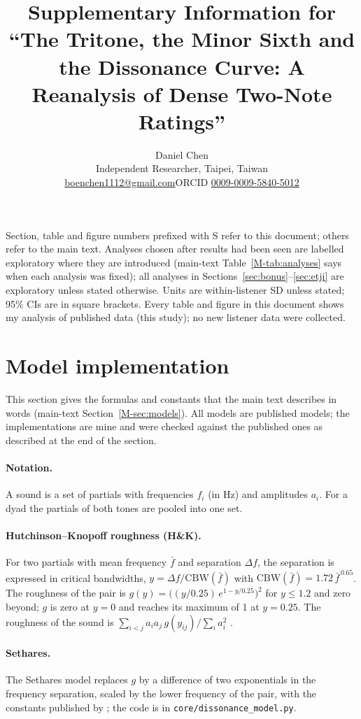 \documentclass[11pt,a4paper]{article}
\title{Supplementary Information for ``The Tritone, the Minor Sixth and the Dissonance Curve: A Reanalysis of Dense Two-Note Ratings''}
\author{Daniel Chen\\[2pt]\normalsize Independent Researcher, Taipei, Taiwan\\[2pt]
  \small \href{mailto:boenchen1112@gmail.com}{boenchen1112@gmail.com}\quad ORCID \href{https://orcid.org/0009-0009-5840-5012}{0009-0009-5840-5012}}
\date{}
\newcommand{\HK}{H\&K}
\begin{document}
\maketitle

\noindent Section, table and figure numbers prefixed with S refer to this document; others
refer to the main text. Analyses chosen after results had been seen are labelled exploratory where they are
introduced (main-text Table~\ref{M-tab:analyses} says when each analysis was fixed); all analyses in Sections~\ref{sec:bonus}--\ref{sec:etji} are exploratory unless stated
otherwise. Units are within-listener SD unless stated; 95\% CIs are in square brackets. Every
table and figure in this document shows my analysis of published data (this study);
no new listener data were collected.

\section{Model implementation}
\label{sec:modelimpl}
This section gives the formulas and constants that the main text describes in words
(main-text Section~\ref{M-sec:models}). All models are published models; the implementations
are mine and were checked against the published ones as described at the end of the section.

\paragraph{Notation.}
A sound is a set of partials with frequencies $f_i$ (in Hz) and amplitudes $a_i$. For a dyad
the partials of both tones are pooled into one set.

\paragraph{Hutchinson--Knopoff roughness (\HK).}
For two partials with mean frequency $\bar f$ and separation $\Delta f$, the separation is
expressed in critical bandwidths, $y=\Delta f/\mathrm{CBW}(\bar f)$ with
$\mathrm{CBW}(\bar f)=1.72\,\bar f^{\,0.65}$. The roughness of the pair is
$g(y)=\bigl((y/0.25)\,e^{1-y/0.25}\bigr)^2$ for $y\le1.2$ and zero beyond; $g$ is zero at
$y=0$ and reaches its maximum of 1 at $y=0.25$. The roughness of the sound is
$\sum_{i<j} a_i a_j\, g(y_{ij}) \big/ \sum_i a_i^2$ \citep{hutchinson1978}.

\paragraph{Sethares.}
The Sethares model replaces $g$ by a difference of two exponentials in the frequency
separation, scaled by the lower frequency of the pair, with the constants published by
\citet{sethares1993}; the code is in \texttt{core/dissonance\_model.py}.
\end{document}
